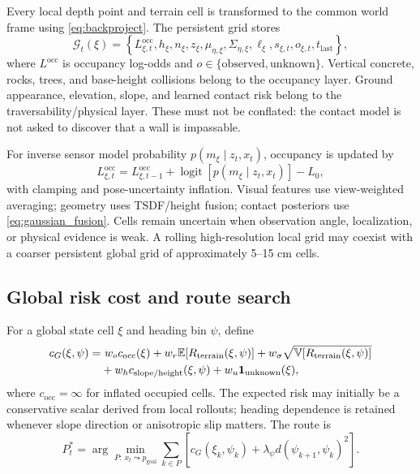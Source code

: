 Every local depth point and terrain cell is transformed to the common world frame using \cref{eq:backproject}. The persistent grid stores
\begin{equation}
\mathcal G_t(\xi)=\left\{
L_{\xi,t}^{\mathrm{occ}},h_\xi,n_\xi,z_\xi,
\mu_{\eta,\xi},\Sigma_{\eta,\xi},\ell_\xi,s_{\xi,t},
o_{\xi,t},t_{\mathrm{last}}
\right\},
\label{eq:global_map}
\end{equation}
where $L^{\mathrm{occ}}$ is occupancy log-odds and $o\in\{\text{observed},\text{unknown}\}$. Vertical concrete, rocks, trees, and base-height collisions belong to the occupancy layer. Ground appearance, elevation, slope, and learned contact risk belong to the traversability/physical layer. These must not be conflated: the contact model is not asked to discover that a wall is impassable.

For inverse sensor model probability $p(m_\xi\mid z_t,x_t)$, occupancy is updated by
\begin{equation}
L_{\xi,t}^{\mathrm{occ}}=L_{\xi,t-1}^{\mathrm{occ}}
+\operatorname{logit}\!\left[p(m_\xi\mid z_t,x_t)\right]-L_0,
\label{eq:occupancy_update}
\end{equation}
with clamping and pose-uncertainty inflation. Visual features use view-weighted averaging; geometry uses TSDF/height fusion; contact posteriors use \cref{eq:gaussian_fusion}. Cells remain uncertain when observation angle, localization, or physical evidence is weak. A rolling high-resolution local grid may coexist with a coarser persistent global grid of approximately 5--15 cm cells.

\subsection{Global risk cost and route search}

For a global state cell $\xi$ and heading bin $\psi$, define
\begin{align}
c_G(\xi,\psi)=&\ w_o c_{\mathrm{occ}}(\xi)
+w_r\mathbb{E}[R_{\mathrm{terrain}}(\xi,\psi)]
+w_\sigma\sqrt{\mathbb{V}[R_{\mathrm{terrain}}(\xi,\psi)]}\\
&+w_hc_{\mathrm{slope/height}}(\xi,\psi)
+w_u\mathbf 1_{\mathrm{unknown}}(\xi),
\label{eq:global_cost}
\end{align}
where $c_{\mathrm{occ}}=\infty$ for inflated occupied cells. The expected risk may initially be a conservative scalar derived from local rollouts; heading dependence is retained whenever slope direction or anisotropic slip matters. The route is
\begin{equation}
P_t^*=\arg\min_{P:\,x_t\leadsto p_{\mathrm{goal}}}
\sum_{k\in P}\left[c_G(\xi_k,\psi_k)+
\lambda_\psi d(\psi_{k+1},\psi_k)^2\right].
\label{eq:global_path}
\end{equation}

